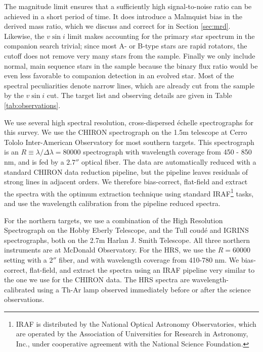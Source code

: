 \documentclass{emulateapj}
\begin{document}
The magnitude limit ensures that a sufficiently high signal-to-noise ratio can be achieved in a short period of time. It does introduce a Malmquist bias in the derived mass ratio, which we discuss and correct for in Section \ref{sec:mrd}. Likewise, the $v\sin{i}$ limit makes accounting for the primary star spectrum in the companion search trivial; since most A- or B-type stars are rapid rotators, the cutoff does not remove very many stars from the sample. Finally we only include normal, main sequence stars in the sample because the binary flux ratio would be even less favorable to companion detection in an evolved star. Most of the spectral peculiarities denote narrow lines, which are already cut from the sample by the $v\sin{i}$ cut. The target list and observing details are given in Table \ref{tab:observations}.

We use several high spectral resolution, cross-dispersed \'echelle spectrographs for this survey. We use the CHIRON spectrograph \citep{CHIRON} on the 1.5m telescope at Cerro Tololo Inter-American Observatory for most southern targets. This spectrograph is an $R\equiv \lambda / \Delta \lambda = 80000$ spectrograph with wavelength coverage from 450 - 850 nm, and is fed by a $2.7''$ optical fiber. The data are automatically reduced with a standard CHIRON data reduction pipeline, but the pipeline leaves residuals of strong lines in adjacent orders. We therefore bias-correct, flat-field and extract the spectra with the optimum extraction technique \citep{Horne1986} using standard IRAF\footnote{IRAF is distributed by the National Optical Astronomy Observatories, which are operated by the Association of Universities for Research in Astronomy, Inc., under cooperative agreement with the National Science Foundation.} tasks, and use the wavelength calibration from the pipeline reduced spectra.

For the northern targets, we use a combination of the High Resolution Spectrograph \citep[HRS,][]{HRS} on the Hobby Eberly Telescope, and the Tull coud\'e \citep[TS23,][]{TS23} and IGRINS \citep{IGRINS} spectrographs, both on the 2.7m Harlan J. Smith Telescope. All three northern instruments are at McDonald Observatory. For the HRS, we use the $R = 60000$ setting with a $2''$ fiber, and with wavelength coverage from 410-780 nm. We bias-correct, flat-field, and extract the spectra using an IRAF pipeline very similar to the one we use for the CHIRON data. The HRS spectra are wavelength-calibrated using a Th-Ar lamp observed immediately before or after the science observations.
\end{document}
